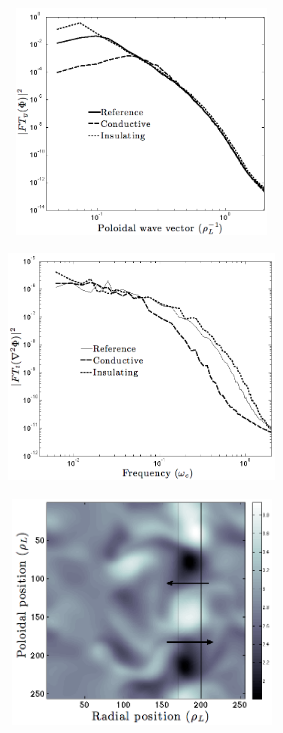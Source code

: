 \documentclass[a4paper,12pt]{article} %
\begin{document}
\thispagestyle{empty}

\begin{figure}[h!]
\center
\caption[Spatial Fourier transform of potential at the center of the stripe where the sheath current boundary 
conditions are modified.]{}
\includegraphics[height=60mm,width=75mm]{figures/FigurePSI2012_2_P1-50_Futtersack.png}
\label{FFTyPhi}
\end{figure}

\thispagestyle{empty}



\begin{figure}[h!]
\center
\caption[Temporal spectrum of vorticity $\nabla^2\phi=W$ at the center of the stripe of modified sheath conductivity.]{}
\includegraphics[height=60mm,width=75mm]{figures/FigurePSI2012_3_P1-50_Futtersack.png}
\label{FFTtW}
\end{figure}


\thispagestyle{empty}

\begin{figure}[h!]
\center
\caption[2D snapshot of the electrostatic potential for the insulating case. Arrows show the direction of the 
$\vec{E}\times \vec{B}$
 drift between the potential structures. The electrostatic potential is expressed in $Te/e$ unit.]{}
\includegraphics[height=60mm,width=75mm]{figures/FigurePSI2012_4_P1-50_Futtersack.png}
\label{PHI}
\end{figure}
\end{document}
